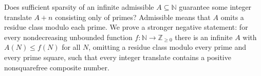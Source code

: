 Does sufficient sparsity of an infinite admissible $A\subseteq\mathbb N$ guarantee some integer translate $A+n$ consisting only of primes? Admissible means that $A$ omits a residue class modulo each prime. We prove a stronger negative statement: for every nondecreasing unbounded function $f:\mathbb N\to\mathbb Z_{\ge0}$ there is an infinite $A$ with $A(N)\le f(N)$ for all $N$, omitting a residue class modulo every prime and every prime square, such that every integer translate contains a positive nonsquarefree composite number.
